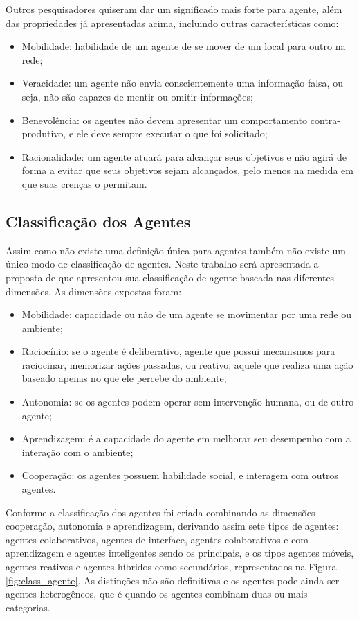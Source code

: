 Outros pesquisadores quiseram dar um significado mais forte para agente, além das propriedades já apresentadas acima, incluindo outras características como:

\begin{itemize}
\item Mobilidade: habilidade de um agente de se mover de um local para outro na rede;
\item Veracidade: um agente não envia conscientemente uma informação falsa, ou seja, não são capazes de mentir ou omitir informações;
\item Benevolência: os agentes não devem apresentar um comportamento contra-produtivo, e ele deve sempre executar o que foi solicitado;
\item Racionalidade: um agente atuará para alcançar seus objetivos e não agirá de forma a evitar que seus objetivos sejam alcançados, pelo menos na medida em que suas crenças o permitam.
\end{itemize}

\subsection{Classificação dos Agentes}

Assim como não existe uma definição única para agentes também não existe um único modo de classificação de agentes. Neste trabalho será apresentada a proposta de \citet{nwana1996software} que apresentou sua classificação de agente baseada nas diferentes dimensões. As dimensões expostas foram:

\begin{itemize}
\item Mobilidade: capacidade ou não de um agente se movimentar por uma rede ou ambiente;
\item Raciocínio: se o agente é deliberativo, agente que possui mecanismos para raciocinar, memorizar ações passadas, ou reativo, aquele que realiza uma ação baseado apenas no que ele percebe do ambiente;
\item Autonomia: se os agentes podem operar sem intervenção humana, ou de outro agente;
\item Aprendizagem: é a capacidade do agente em melhorar seu desempenho com a interação com o ambiente;
\item Cooperação: os agentes possuem habilidade social, e interagem com outros agentes.
\end{itemize}

 Conforme \cite{nwana1996software} a classificação dos agentes foi criada  combinando as dimensões cooperação, autonomia e aprendizagem, derivando assim sete tipos de agentes: agentes colaborativos, agentes de interface, agentes colaborativos e com aprendizagem e agentes inteligentes sendo os principais, e os tipos  agentes móveis, agentes reativos e agentes híbridos como secundários, representados na Figura \ref{fig:class_agente}. As distinções não são definitivas e os agentes pode ainda ser agentes heterogêneos, que é quando os agentes combinam duas ou mais categorias.




